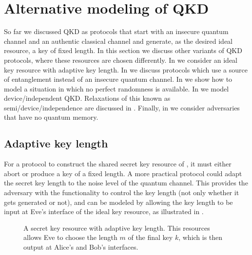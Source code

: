\section{Alternative modeling of QKD}
\label{sec:alternative}

So far we discussed QKD as protocols that start with an insecure
quantum channel and an authentic classical channel and generate, as
the desired ideal resource, a key of fixed length. In this section we
discuss other variants of QKD protocols, where these resources are
chosen differently. In  we
consider an ideal key resource with adaptive key length. In
 we discuss protocols which
use a source of entanglement instead of an insecure quantum
channel. In  we show how to
model a situation in which no perfect randomness is available.  In
 we model device\-/independent
QKD. Relaxations of this known as semi\-/device\-/independence are
discussed in . Finally, in
 we consider adversaries that have
no quantum memory.


\subsection{Adaptive key length}
\label{sec:alternative.adaptive}

For a protocol to construct the shared secret key resource of , it must either abort or produce a key of a fixed length. A more practical protocol could adapt the secret key length to the noise level of the quantum channel. This provides the adversary with the functionality to control the key length (not only whether it gets generated or not), and can be modeled by allowing the key length to be input at Eve's interface of the ideal key resource, as illustrated in .

\begin{figure}[tb]



\caption[Secret key resource with adaptive
length]{\label{fig:qkd.resource.adaptive}A secret key resource with   adaptive key length. This resources allows Eve to choose the length $m$   of the final key $k$, which is then output at Alice's and Bob's interfaces.}
\end{figure}

